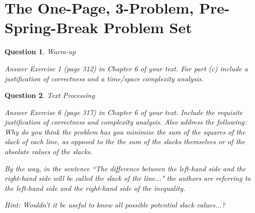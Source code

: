 \documentclass[10pt]{article}
\newtheorem{question}{Question}
\begin{document}
\allsectionsfont{\centering}

\section*{The One-Page, 3-Problem, Pre-Spring-Break Problem Set}

\begin{question}{Warm-up}

Answer Exercise 1 (page 312) in Chapter 6 of your text.  For part (c) include a justification of correctness and a time/space complexity analysis.
\end{question}

\begin{question}{Text Processing}

Answer Exercise 6 (page 317) in Chapter 6 of your text.  Include the requisite justification of correctness and complexity analysis.  Also address the following: Why do you think the problem has you minimize the sum of the {\em squares} of the slack of each line, as opposed to the the sum of the slacks themselves or of the absolute values of the slacks.

By the way, in the sentence ``The difference between the left-hand side and the right-hand side will be called the {\em slack} of the line..." the authors are referring to the left-hand side and the right-hand side of the inequality.

Hint: Wouldn't it be useful to know all possible potential slack values...?
\end{question}
\end{document}
